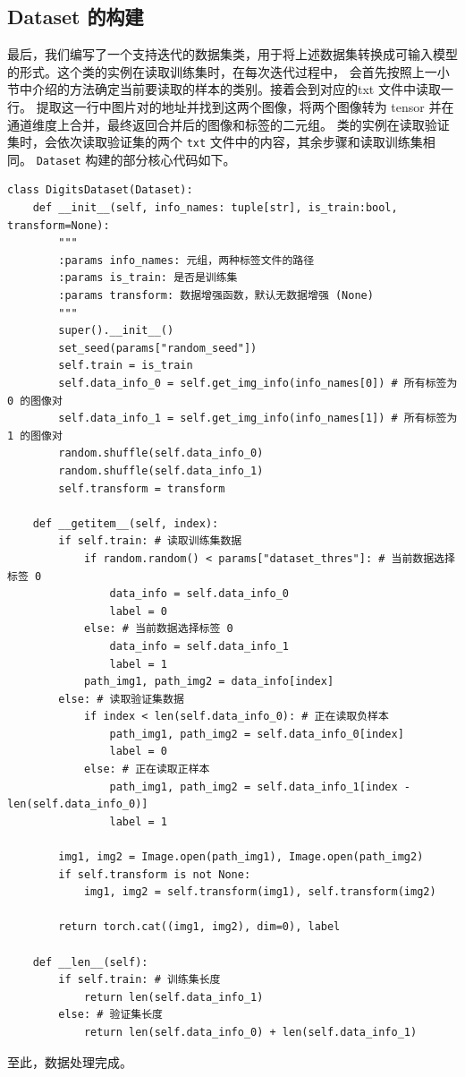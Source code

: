 \documentclass[supercite]{Experimental_Report}
\theoremstyle{definition}
\begin{document}
\subsection{Dataset 的构建}
最后，我们编写了一个支持迭代的数据集类，用于将上述数据集转换成可输入模型的形式。这个类的实例在读取训练集时，在每次迭代过程中，
会首先按照上一小节中介绍的方法确定当前要读取的样本的类别。接着会到对应的txt 文件中读取一行。
提取这一行中图片对的地址并找到这两个图像，将两个图像转为 tensor 并在通道维度上合并，最终返回合并后的图像和标签的二元组。
类的实例在读取验证集时，会依次读取验证集的两个 \texttt{txt} 文件中的内容，其余步骤和读取训练集相同。
\texttt{Dataset} 构建的部分核心代码如下。
\begin{lstlisting}
class DigitsDataset(Dataset):
    def __init__(self, info_names: tuple[str], is_train:bool, transform=None):
		"""
		:params info_names: 元组，两种标签文件的路径
		:params is_train: 是否是训练集
		:params transform: 数据增强函数，默认无数据增强 (None)
		"""
        super().__init__()
        set_seed(params["random_seed"])
        self.train = is_train
        self.data_info_0 = self.get_img_info(info_names[0]) # 所有标签为 0 的图像对
        self.data_info_1 = self.get_img_info(info_names[1]) # 所有标签为 1 的图像对
        random.shuffle(self.data_info_0)
        random.shuffle(self.data_info_1)
        self.transform = transform

	def __getitem__(self, index):
		if self.train: # 读取训练集数据
			if random.random() < params["dataset_thres"]: # 当前数据选择标签 0
				data_info = self.data_info_0
				label = 0
			else: # 当前数据选择标签 0
				data_info = self.data_info_1
				label = 1
			path_img1, path_img2 = data_info[index]
		else: # 读取验证集数据
			if index < len(self.data_info_0): # 正在读取负样本
				path_img1, path_img2 = self.data_info_0[index]
				label = 0
			else: # 正在读取正样本
				path_img1, path_img2 = self.data_info_1[index - len(self.data_info_0)]
				label = 1
		
		img1, img2 = Image.open(path_img1), Image.open(path_img2)
		if self.transform is not None:
			img1, img2 = self.transform(img1), self.transform(img2)

		return torch.cat((img1, img2), dim=0), label
	
	def __len__(self):
		if self.train: # 训练集长度
			return len(self.data_info_1)
		else: # 验证集长度
			return len(self.data_info_0) + len(self.data_info_1)
\end{lstlisting}

至此，数据处理完成。
\end{document}
